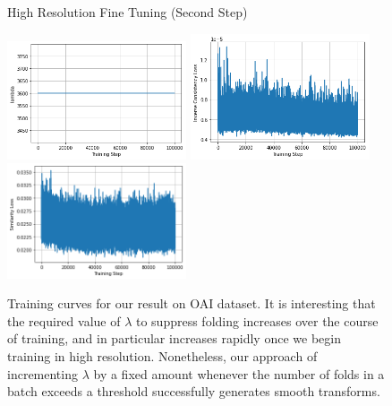 \documentclass[10pt,onecolumn,letterpaper]{article} %
\begin{document}
\begin{figure}
    High Resolution Fine Tuning (Second Step)\par\medskip
    \includegraphics[width=150pt]{OAI-training-curves/high_2_lambda.png}
    \includegraphics[width=150pt]{OAI-training-curves/high_2_Linv.png}
    \includegraphics[width=150pt]{OAI-training-curves/high_2_Lsim.png}
    \caption{Training curves for our result on OAI dataset. It is interesting that the required value of $\lambda$ to suppress folding increases over the course of training, and in particular increases rapidly once we begin training in high resolution. Nonetheless, our approach of incrementing $\lambda$ by a fixed amount whenever the number of folds in a batch exceeds a threshold successfully generates smooth transforms.}
    \label{fig:training_curves}
\end{figure}



{
  
  
}
    {
      
      {\small
        
        
      }
    }
\end{document}
